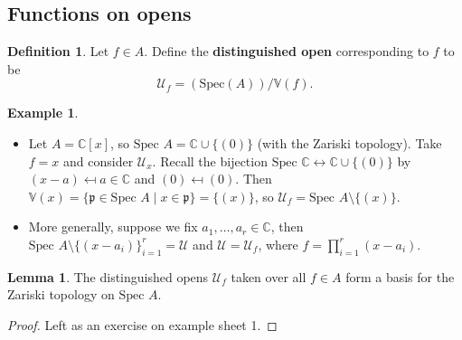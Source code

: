 \documentclass{article}
\theoremstyle{definition}
\newtheorem{lemma}[theorem]{Lemma}
\newtheorem{example}{Example}[section]
\newtheorem{defn}{Definition}[section]
\begin{document}
\subsection{Functions on opens}
\begin{defn}
    Let $f \in A$. Define the \textbf{distinguished open} corresponding to $f$ to be \[
    \mathcal{U}_{f} = (\text{Spec}(A))/\mathbb{V}(f).
    \]
\end{defn}
\begin{example}
    \begin{itemize}
        \item Let $A = \mathbb{C}[x]$, so $\text{Spec }A = \mathbb{C} \cup \{(0)\}$ (with the Zariski topology). Take $f = x$ and consider $\mathcal{U}_x$. Recall the bijection $\text{Spec }\mathbb{C} \leftrightarrow \mathbb{C} \cup \{(0)\}$ by $(x-a) \mapsfrom a \in \mathbb{C}$ and $(0) \mapsfrom (0)$. Then $\mathbb{V}(x) = \{\mathfrak{p} \in \text{Spec }A \mid x \in \mathfrak{p}\} = \{(x)\}$, so $\mathcal{U}_f = \text{Spec }A \setminus \{(x)\}$.
        \item More generally, suppose we fix $a_1,\ldots,a_r \in \mathbb{C}$, then $\text{Spec }A\setminus \{(x-a_i)\}_{i=1}^r = \mathcal{U}$ and $\mathcal{U} = \mathcal{U}_f$, where $f = \prod_{i=1}^{r} (x-a_i)$.
    \end{itemize}
\end{example}
\begin{lemma}
    The distinguished opens $\mathcal{U}_f$ taken over all $f \in A$ form a basis for the Zariski topology on $\text{Spec }A$.
\end{lemma}
\begin{proof}
    Left as an exercise on example sheet 1.
\end{proof}
\end{document}
